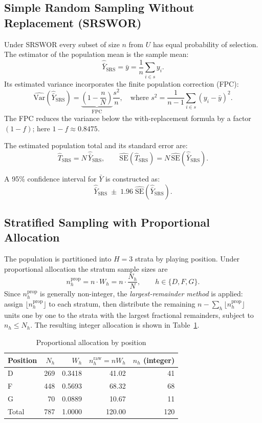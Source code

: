 \documentclass[12pt]{article}
\newcommand{\VarHat}{\widehat{\mathrm{Var}}}
\newcommand{\SEHat}{\widehat{\mathrm{SE}}}
\begin{document}
\subsection{Simple Random Sampling Without Replacement (SRSWOR)}
\label{sec:srs}

Under SRSWOR every subset of size $n$ from $U$ has equal probability of selection.
The estimator of the population mean is the sample mean:
\[
  \hat{\bar{Y}}_{\mathrm{SRS}} = \bar{y} = \frac{1}{n}\sum_{i \in s} y_i.
\]
Its estimated variance incorporates the finite population correction (FPC):
\[
  \VarHat\!\left(\hat{\bar{Y}}_{\mathrm{SRS}}\right)
  = \underbrace{\left(1 - \frac{n}{N}\right)}_{\text{FPC}} \frac{s^2}{n},
  \quad \text{where } s^2 = \frac{1}{n-1}\sum_{i \in s}(y_i - \bar{y})^2.
\]
The FPC reduces the variance below the with-replacement formula by a factor
$(1-f)$; here $1 - f \approx 0.8475$.

The estimated population total and its standard error are:
\[
  \hat{T}_{\mathrm{SRS}} = N\,\hat{\bar{Y}}_{\mathrm{SRS}},
  \qquad
  \SEHat\!\left(\hat{T}_{\mathrm{SRS}}\right) = N\,\SEHat\!\left(\hat{\bar{Y}}_{\mathrm{SRS}}\right).
\]

A 95\% confidence interval for $\bar{Y}$ is constructed as:
\[
  \hat{\bar{Y}}_{\mathrm{SRS}}
  \;\pm\; 1.96\;\SEHat\!\left(\hat{\bar{Y}}_{\mathrm{SRS}}\right).
\]

\subsection{Stratified Sampling with Proportional Allocation}
\label{sec:prop}

The population is partitioned into $H = 3$ strata by playing position.
Under proportional allocation the stratum sample sizes are
\[
  n_h^{\mathrm{prop}} = n \cdot W_h = n \cdot \frac{N_h}{N}, \qquad h \in \{D,F,G\}.
\]
Since $n_h^{\mathrm{prop}}$ is generally non-integer, the \emph{largest-remainder
method} is applied: assign $\lfloor n_h^{\mathrm{prop}} \rfloor$ to each stratum,
then distribute the remaining $n - \sum_h \lfloor n_h^{\mathrm{prop}} \rfloor$
units one by one to the strata with the largest fractional remainders, subject to
$n_h \leq N_h$. The resulting integer allocation is shown in Table~\ref{tab:prop_alloc}.

\begin{table}[H]
\centering
\caption{Proportional allocation by position}
\label{tab:prop_alloc}
\begin{tabular}{lrrrr}
\toprule
Position & $N_h$ & $W_h$ & $n_h^{\text{raw}} = nW_h$ & $n_h$ (integer) \\
\midrule
D & 269 & 0.3418 & 41.02 & 41 \\
F & 448 & 0.5693 & 68.32 & 68 \\
G &  70 & 0.0889 & 10.67 & 11 \\
\midrule
Total & 787 & 1.0000 & 120.00 & 120 \\
\bottomrule
\end{tabular}
\end{table}
\end{document}
